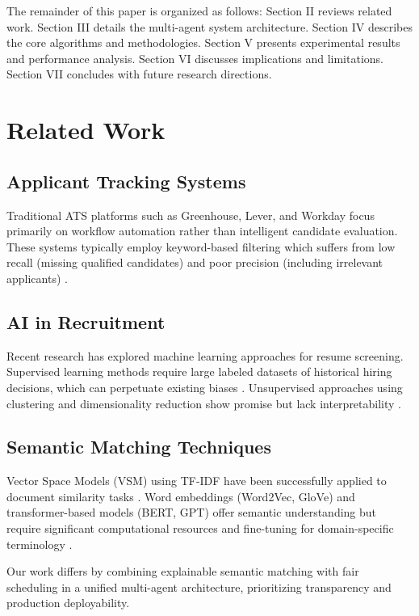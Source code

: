 \documentclass[conference]{IEEEtran}
\begin{document}
The remainder of this paper is organized as follows: Section II reviews related work. Section III details the multi-agent system architecture. Section IV describes the core algorithms and methodologies. Section V presents experimental results and performance analysis. Section VI discusses implications and limitations. Section VII concludes with future research directions.

\section{Related Work}

\subsection{Applicant Tracking Systems}

Traditional ATS platforms such as Greenhouse, Lever, and Workday focus primarily on workflow automation rather than intelligent candidate evaluation. These systems typically employ keyword-based filtering which suffers from low recall (missing qualified candidates) and poor precision (including irrelevant applicants) \cite{ats_review}.

\subsection{AI in Recruitment}

Recent research has explored machine learning approaches for resume screening. Supervised learning methods require large labeled datasets of historical hiring decisions, which can perpetuate existing biases \cite{bias_ml}. Unsupervised approaches using clustering and dimensionality reduction show promise but lack interpretability \cite{unsupervised_hiring}.

\subsection{Semantic Matching Techniques}

Vector Space Models (VSM) using TF-IDF have been successfully applied to document similarity tasks \cite{tfidf_foundations}. Word embeddings (Word2Vec, GloVe) and transformer-based models (BERT, GPT) offer semantic understanding but require significant computational resources and fine-tuning for domain-specific terminology \cite{bert_recruiting}.

Our work differs by combining explainable semantic matching with fair scheduling in a unified multi-agent architecture, prioritizing transparency and production deployability.
\end{document}
